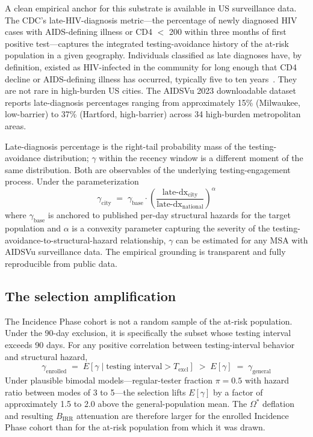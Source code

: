 \documentclass[11pt]{article}
\begin{document}
A clean empirical anchor for this substrate is available in US surveillance data. The CDC's late-HIV-diagnosis metric---the percentage of newly diagnosed HIV cases with AIDS-defining illness or CD4 $<$ 200 within three months of first positive test---captures the integrated testing-avoidance history of the at-risk population in a given geography. Individuals classified as late diagnoses have, by definition, existed as HIV-infected in the community for long enough that CD4 decline or AIDS-defining illness has occurred, typically five to ten years~\cite{cdcatp2023}. They are not rare in high-burden US cities. The AIDSVu 2023 downloadable dataset~\cite{aidsvu2023} reports late-diagnosis percentages ranging from approximately 15\% (Milwaukee, low-barrier) to 37\% (Hartford, high-barrier) across 34 high-burden metropolitan areas.

Late-diagnosis percentage is the right-tail probability mass of the testing-avoidance distribution; $\gamma$ within the recency window is a different moment of the same distribution. Both are observables of the underlying testing-engagement process. Under the parameterization
\begin{equation}
\gamma_{\mathrm{city}} \;=\; \gamma_{\mathrm{base}} \cdot \left(\frac{\text{late-dx}_{\mathrm{city}}}{\text{late-dx}_{\mathrm{national}}}\right)^\alpha \label{eq:gamma_city}
\end{equation}
where $\gamma_{\mathrm{base}}$ is anchored to published per-day structural hazards for the target population and $\alpha$ is a convexity parameter capturing the severity of the testing-avoidance-to-structural-hazard relationship, $\gamma$ can be estimated for any MSA with AIDSVu surveillance data. The empirical grounding is transparent and fully reproducible from public data.

\subsection{The selection amplification}

The Incidence Phase cohort is not a random sample of the at-risk population. Under the 90-day exclusion, it is specifically the subset whose testing interval exceeds 90 days. For any positive correlation between testing-interval behavior and structural hazard,
\begin{equation}
\gamma_{\mathrm{enrolled}} \;=\; E[\gamma \mid \text{testing interval} > T_{\mathrm{excl}}] \;>\; E[\gamma] \;=\; \gamma_{\mathrm{general}} \label{eq:selection}
\end{equation}
Under plausible bimodal models---regular-tester fraction $\pi = 0.5$ with hazard ratio between modes of 3 to 5---the selection lifts $E[\gamma]$ by a factor of approximately 1.5 to 2.0 above the general-population mean. The $\Omega^*$ deflation and resulting $B_{\mathrm{IRR}}$ attenuation are therefore larger for the enrolled Incidence Phase cohort than for the at-risk population from which it was drawn.
\end{document}
